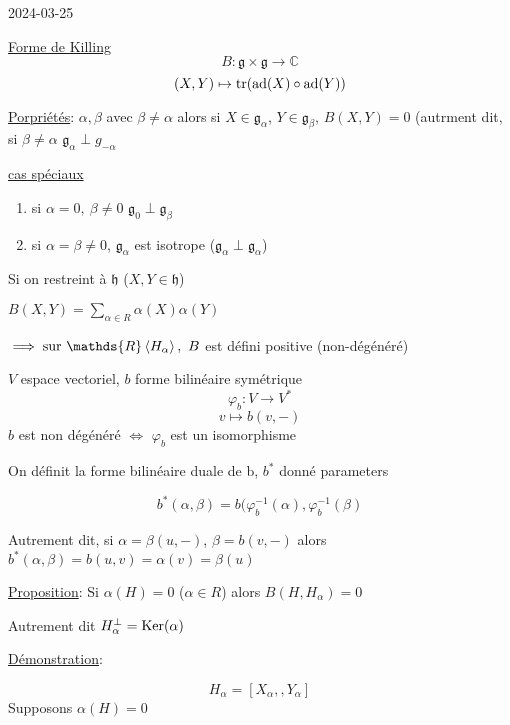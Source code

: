 


2024-03-25

\begin{tcolorbox}[title=Rappel]
	\underline{Forme de Killing}
	\[ B: \mathfrak{g} \times  \mathfrak{g} \to \mathds{C} \]
	\[ (X,Y) \mapsto \tr({\rm{}ad}(X) \circ {\rm{}ad}(Y)) \]

	\underline{Porpriétés}: 
		\(\alpha, \beta\) avec \(\beta \neq \alpha\) alors si \(X \in \mathfrak{g}_\alpha\), \(Y \in \mathfrak{g}_\beta\), \(B(X,Y) = 0\)
	(autrment dit, si \(\beta \neq \alpha\) \(\mathfrak{g}_\alpha \perp g_{-\alpha} \)

\underline{cas spéciaux} 
\begin{enumerate}
	\item si \(\alpha = 0, \ \beta \neq 0\) \(\mathfrak{g}_0 \perp \mathfrak{g}_{\beta} \)
	\item si \(\alpha = \beta \neq 0\), \(\mathfrak{g}_\alpha\) est isotrope (\(\mathfrak{g}_\alpha \perp \mathfrak{g}_\alpha \))
\end{enumerate}

Si on restreint à \(\mathfrak{h}\) (\(X,Y \in \mathfrak{h}\))

\(B(X,Y) = \sum_{\alpha\in R} \alpha(X) \alpha(Y)\)
	
\(\implies \text{sur } \mathds{R}\expval{H_\alpha}, \ B\) est défini positive (non-dégénéré) 
\end{tcolorbox}

\begin{tcolorbox}[title=Rappel d'algèbre linéaire]
	\(V\) espace vectoriel, \(b\) forme bilinéaire symétrique	 
	\[ \varphi_b : V \to V^{*} \]
	\[ v \mapsto b(v,-) \]
\(b\) est non dégénéré \(\iff\) \(\varphi_b\) est un isomorphisme

On définit la forme bilinéaire duale de b, \(b^{*}\) donné parameters

\[ b^{*} (\alpha, \beta) = b(\varphi_b^{-1}(\alpha) , \varphi_b ^{-1} (\beta ) \]

Autrement dit, si \(\alpha = \beta(u,-) \), \(\beta = b(v, -)\) alors
\(b^{*}(\alpha, \beta) = b(u,v) =\alpha (v) = \beta (u) \)
\end{tcolorbox}

\underline{Proposition}: 
Si \(\alpha(H) = 0\) (\(\alpha \in R\)) alors \(B(H, H_\alpha) =0\)

Autrement dit \(H_{\alpha}^{\perp} = {\rm{}Ker}(\alpha)\)

\underline{Démonstration}:

\[ H_{\alpha} = [X_{\alpha},, Y_\alpha]  \]
Supposons \(\alpha (H) = 0\)

